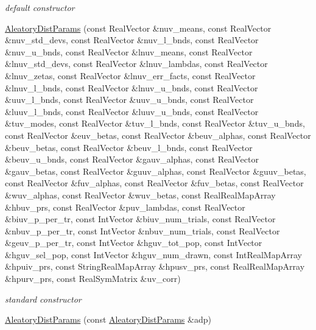 \begin{DoxyCompactItemize}
\begin{DoxyCompactList}\small\item\em default constructor \end{DoxyCompactList}\item 
\hyperlink{classPecos_1_1AleatoryDistParams_a8d9a174716d0ec198667f9e024a0f69c}{Aleatory\+Dist\+Params} (const Real\+Vector \&nuv\+\_\+means, const Real\+Vector \&nuv\+\_\+std\+\_\+devs, const Real\+Vector \&nuv\+\_\+l\+\_\+bnds, const Real\+Vector \&nuv\+\_\+u\+\_\+bnds, const Real\+Vector \&lnuv\+\_\+means, const Real\+Vector \&lnuv\+\_\+std\+\_\+devs, const Real\+Vector \&lnuv\+\_\+lambdas, const Real\+Vector \&lnuv\+\_\+zetas, const Real\+Vector \&lnuv\+\_\+err\+\_\+facts, const Real\+Vector \&lnuv\+\_\+l\+\_\+bnds, const Real\+Vector \&lnuv\+\_\+u\+\_\+bnds, const Real\+Vector \&uuv\+\_\+l\+\_\+bnds, const Real\+Vector \&uuv\+\_\+u\+\_\+bnds, const Real\+Vector \&luuv\+\_\+l\+\_\+bnds, const Real\+Vector \&luuv\+\_\+u\+\_\+bnds, const Real\+Vector \&tuv\+\_\+modes, const Real\+Vector \&tuv\+\_\+l\+\_\+bnds, const Real\+Vector \&tuv\+\_\+u\+\_\+bnds, const Real\+Vector \&euv\+\_\+betas, const Real\+Vector \&beuv\+\_\+alphas, const Real\+Vector \&beuv\+\_\+betas, const Real\+Vector \&beuv\+\_\+l\+\_\+bnds, const Real\+Vector \&beuv\+\_\+u\+\_\+bnds, const Real\+Vector \&gauv\+\_\+alphas, const Real\+Vector \&gauv\+\_\+betas, const Real\+Vector \&guuv\+\_\+alphas, const Real\+Vector \&guuv\+\_\+betas, const Real\+Vector \&fuv\+\_\+alphas, const Real\+Vector \&fuv\+\_\+betas, const Real\+Vector \&wuv\+\_\+alphas, const Real\+Vector \&wuv\+\_\+betas, const Real\+Real\+Map\+Array \&hbuv\+\_\+prs, const Real\+Vector \&puv\+\_\+lambdas, const Real\+Vector \&biuv\+\_\+p\+\_\+per\+\_\+tr, const Int\+Vector \&biuv\+\_\+num\+\_\+trials, const Real\+Vector \&nbuv\+\_\+p\+\_\+per\+\_\+tr, const Int\+Vector \&nbuv\+\_\+num\+\_\+trials, const Real\+Vector \&geuv\+\_\+p\+\_\+per\+\_\+tr, const Int\+Vector \&hguv\+\_\+tot\+\_\+pop, const Int\+Vector \&hguv\+\_\+sel\+\_\+pop, const Int\+Vector \&hguv\+\_\+num\+\_\+drawn, const Int\+Real\+Map\+Array \&hpuiv\+\_\+prs, const String\+Real\+Map\+Array \&hpusv\+\_\+prs, const Real\+Real\+Map\+Array \&hpurv\+\_\+prs, const Real\+Sym\+Matrix \&uv\+\_\+corr)\label{classPecos_1_1AleatoryDistParams_a8d9a174716d0ec198667f9e024a0f69c}

\begin{DoxyCompactList}\small\item\em standard constructor \end{DoxyCompactList}\item 
\hyperlink{classPecos_1_1AleatoryDistParams_ab88e9fffb9f839f76553fee50d4a9703}{Aleatory\+Dist\+Params} (const \hyperlink{classPecos_1_1AleatoryDistParams}{Aleatory\+Dist\+Params} \&adp)\label{classPecos_1_1AleatoryDistParams_ab88e9fffb9f839f76553fee50d4a9703}


\end{DoxyCompactItemize}
